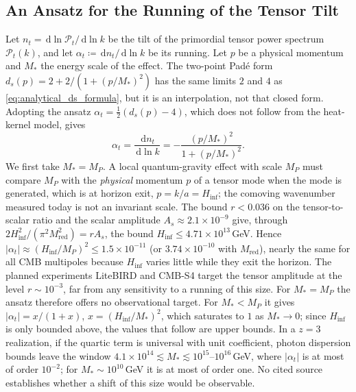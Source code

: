 \documentclass[11pt,a4paper,reqno]{amsart}
\theoremstyle{definition}
\numberwithin{equation}{section}
\newcommand{\dif}{\,\mathrm{d}}
\begin{document}
\subsection{An Ansatz for the Running of the Tensor Tilt}
Let $n_t = \dif\ln\mathcal{P}_t/\dif\ln k$ be the tilt of the primordial tensor power spectrum $\mathcal{P}_t(k)$, and let $\alpha_t \coloneqq \dif n_t/\dif\ln k$ be its running. Let $p$ be a physical momentum and $M_\ast$ the energy scale of the effect. The two-point Pad\'e form $d_s(p) = 2 + 2/(1 + (p/M_\ast)^2)$ has the same limits $2$ and $4$ as \eqref{eq:analytical_ds_formula}, but it is an interpolation, not that closed form. Adopting the ansatz $\alpha_t = \frac{1}{2}(d_s(p) - 4)$, which does not follow from the heat-kernel model, gives
\begin{equation}
    \alpha_t = \frac{\dif n_t}{\dif\ln k} = -\frac{(p/M_\ast)^2}{1 + (p/M_\ast)^2}.
\end{equation}
We first take $M_\ast = M_P$. A local quantum-gravity effect with scale $M_P$ must compare $M_P$ with the \emph{physical} momentum $p$ of a tensor mode when the mode is generated, which is at horizon exit, $p = k/a = H_{\mathrm{inf}}$; the comoving wavenumber measured today is not an invariant scale. The bound $r < 0.036$ on the tensor-to-scalar ratio \cite{bicepkeck2021constraints} and the scalar amplitude $A_s \approx 2.1 \times 10^{-9}$ \cite{planck2018parameters} give, through $2H_{\mathrm{inf}}^2/(\pi^2 M_{\mathrm{red}}^2) = r A_s$, the bound $H_{\mathrm{inf}} \le 4.71 \times 10^{13}$\,GeV. Hence $|\alpha_t| \approx (H_{\mathrm{inf}}/M_P)^2 \le 1.5 \times 10^{-11}$ (or $3.74 \times 10^{-10}$ with $M_{\mathrm{red}}$), nearly the same for all CMB multipoles because $H_{\mathrm{inf}}$ varies little while they exit the horizon. The planned experiments LiteBIRD and CMB-S4 target the tensor amplitude at the level $r \sim 10^{-3}$, far from any sensitivity to a running of this size. For $M_\ast = M_P$ the ansatz therefore offers no observational target. For $M_\ast < M_P$ it gives $|\alpha_t| = x/(1+x)$, $x = (H_{\mathrm{inf}}/M_\ast)^2$, which saturates to $1$ as $M_\ast \to 0$; since $H_{\mathrm{inf}}$ is only bounded above, the values that follow are upper bounds. In a $z = 3$ realization, if the quartic term is universal with unit coefficient, photon dispersion bounds leave the window $4.1\times10^{14} \lesssim M_\ast \lesssim 10^{15}$--$10^{16}$\,GeV, where $|\alpha_t|$ is at most of order $10^{-2}$; for $M_\ast \sim 10^{10}$\,GeV it is at most of order one. No cited source establishes whether a shift of this size would be observable.
\end{document}
